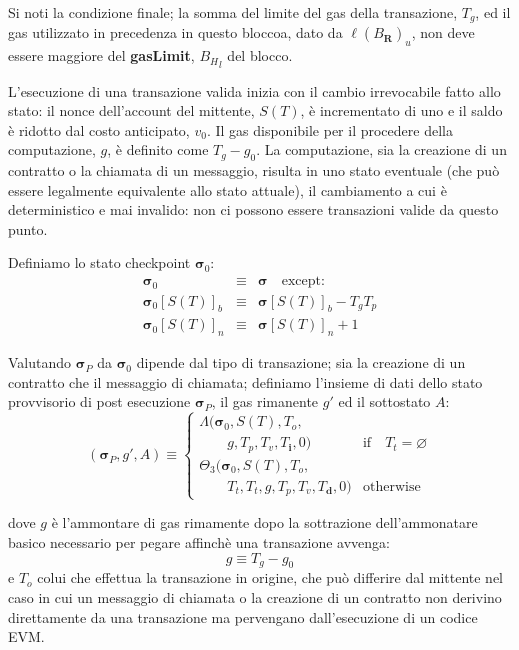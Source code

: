 \documentclass[9pt,oneside]{amsart}
\begin{document}
\begin{multicols}{2}
Si noti la condizione finale; la somma del limite del gas della transazione, $T_g$, ed il gas utilizzato in precedenza in questo bloccoa, dato da $\ell(B_\mathbf{R})_u$, non deve essere maggiore del \textbf{gasLimit}, ${B_H}_l$ del blocco. 

L'esecuzione di una transazione valida inizia con il cambio irrevocabile fatto allo stato: il nonce dell'account del mittente, $S(T)$, è incrementato di uno e il saldo è ridotto dal costo anticipato, $v_0$. Il gas disponibile per il procedere della computazione, $g$, è definito come $T_g - g_0$. La computazione, sia la creazione di un contratto o la chiamata di un messaggio, risulta in uno stato eventuale (che può essere legalmente equivalente allo stato attuale), il cambiamento a cui è deterministico e mai invalido: non ci possono essere transazioni valide da questo punto.

Definiamo lo stato checkpoint $\boldsymbol{\sigma}_0$:
\begin{eqnarray}
\boldsymbol{\sigma}_0 & \equiv & \boldsymbol{\sigma} \quad \text{except:} \\
\boldsymbol{\sigma}_0[S(T)]_b & \equiv & \boldsymbol{\sigma}[S(T)]_b - T_g T_p \\
\boldsymbol{\sigma}_0[S(T)]_n & \equiv & \boldsymbol{\sigma}[S(T)]_n + 1
\end{eqnarray}

Valutando $\boldsymbol{\sigma}_P$ da $\boldsymbol{\sigma}_0$ dipende dal tipo di transazione; sia la creazione di un contratto che il messaggio di chiamata; definiamo l'insieme di dati dello stato provvisorio di post esecuzione $\boldsymbol{\sigma}_P$, il gas rimanente $g'$ ed il sottostato $A$:
\begin{equation}
(\boldsymbol{\sigma}_P, g', A) \equiv \begin{cases}
\Lambda(\boldsymbol{\sigma}_0, S(T), T_o, &\\ \quad\quad g, T_p, T_v, T_\mathbf{i}, 0) & \text{if} \quad T_t = \varnothing \\
\Theta_{3}(\boldsymbol{\sigma}_0, S(T), T_o, &\\ \quad\quad T_t, T_t, g, T_p, T_v, T_\mathbf{d}, 0) & \text{otherwise}
\end{cases}
\end{equation}

dove $g$ è l'ammontare di gas rimamente dopo la sottrazione dell'ammonatare basico necessario per pegare affinchè una transazione avvenga:
\begin{equation}
g \equiv T_g - g_0
\end{equation}
e $T_o$ colui che effettua la transazione in origine, che può differire dal mittente nel caso in cui un messaggio di chiamata o la creazione di un contratto non derivino direttamente da una transazione ma pervengano dall'esecuzione di un codice EVM.


\end{multicols}
\end{document}
